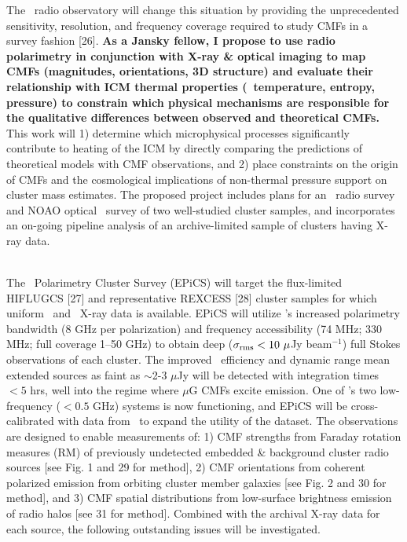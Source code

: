 \documentclass[letterpaper,12pt]{article}
\newcommand{\myhead}{Cavagnolo, Jansky Proposal}
\begin{document}
The \evla\ radio observatory will change this situation by providing
the unprecedented sensitivity, resolution, and frequency coverage
required to study CMFs in a survey fashion [26]. {\bf{As a Jansky
    fellow, I propose to use radio polarimetry in conjunction with
    X-ray \& optical imaging to map CMFs (magnitudes, orientations, 3D
    structure) and evaluate their relationship with ICM thermal
    properties (\eg\ temperature, entropy, pressure) to constrain
    which physical mechanisms are responsible for the qualitative
    differences between observed and theoretical CMFs.}}  This work
will 1) determine which microphysical processes significantly
contribute to heating of the ICM by directly comparing the predictions
of theoretical models with CMF observations, and 2) place constraints
on the origin of CMFs and the cosmological implications of non-thermal
pressure support on cluster mass estimates. The proposed project
includes plans for an \evla\ radio survey and NOAO optical
\halpha\ survey of two well-studied cluster samples, and incorporates
an on-going pipeline analysis of an archive-limited sample of clusters
having X-ray data.\\

\markright{\myhead}\\
\indent The \evla\ Polarimetry Cluster Survey (EPiCS) will target the
flux-limited HIFLUGCS [27] and representative REXCESS [28] cluster
samples for which uniform \chandra\ and \xmm\ X-ray data is
available. EPiCS will utilize \evla's increased polarimetry bandwidth
(8 GHz per polarization) and frequency accessibility (74 MHz; 330 MHz;
full coverage 1--50 GHz) to obtain deep ($\sigma_{\rm{rms}} < 10
~\mu$Jy beam$^{-1}$) full Stokes observations of each cluster. The
improved \evla\ efficiency and dynamic range mean extended sources as
faint as $\sim$2-3 $\mu$Jy will be detected with integration times $<
5$ hrs, well into the regime where $\mu$G CMFs excite emission. One of
\evla's two low-frequency ($< 0.5$ GHz) systems is now functioning,
and EPiCS will be cross-calibrated with data from \lofar\ to expand
the utility of the dataset. The observations are designed to enable
measurements of: 1) CMF strengths from Faraday rotation measures (RM)
of previously undetected embedded \& background cluster radio sources
[see Fig. 1 and 29 for method], 2) CMF orientations from coherent
polarized emission from orbiting cluster member galaxies [see Fig. 2
  and 30 for method], and 3) CMF spatial distributions from
low-surface brightness emission of radio halos [see 31 for
  method]. Combined with the archival X-ray data for each source, the
following outstanding issues will be investigated.
\end{document}
